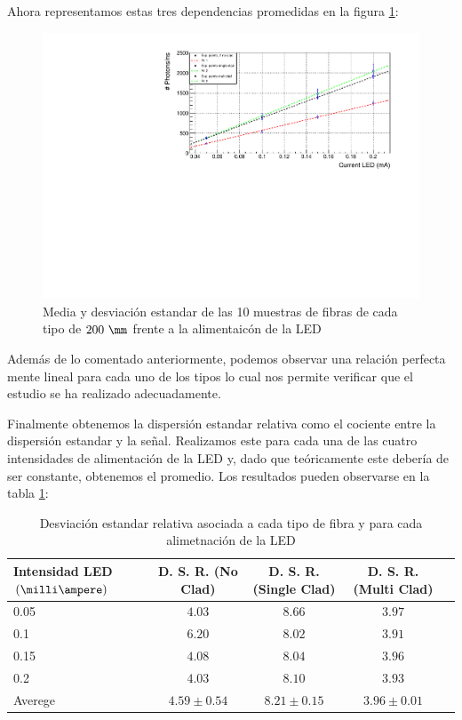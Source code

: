 Ahora representamos estas tres dependencias promedidas en la figura \ref{mediafibras}:

\begin{figure}[H]
\centering
\includegraphics[scale=0.7]{Figuras/HoudaCase.pdf}
\caption{Media y desviación estandar de las 10 muestras de fibras de cada tipo de $200~\mm$ frente a la alimentaicón de la LED\label{mediafibras}}
\end{figure}


Además de lo comentado anteriormente, podemos observar una relación perfecta mente lineal para cada uno de los tipos lo cual nos permite verificar que el estudio se ha realizado adecuadamente.

Finalmente obtenemos la dispersión estandar relativa como el cociente entre la dispersión estandar y la señal. Realizamos este para cada una de las cuatro intensidades de alimentación de la LED y, dado que teóricamente este debería de ser constante, obtenemos el promedio. Los resultados pueden observarse en la tabla \ref{relativefibers}:

\begin{table}[H]
\begin{center}
\begin{tabular}{l | c | c | c | c }

Intensidad LED $(\milli\ampere)$ & D. S. R. (No Clad) & D. S. R. (Single Clad) & D. S. R. (Multi Clad)\\
\hline \hline
0.05 & $4.03$ & $8.66$ & $3.97$\\ 
0.1 & $6.20$ & $8.02$ & $3.91$\\
0.15 & $4.08$ & $8.04$ & $3.96$\\
0.2 & $4.03$ & $8.10$ & $3.93$\\
\hline \hline
Averege & $4.59\pm 0.54$ & $8.21\pm0.15$ & $3.96 \pm 0.01$

\end{tabular}
\caption{Desviación estandar relativa asociada a cada tipo de fibra y para cada alimetnación de la LED\label{relativefibers}}
\end{center}
\end{table}

